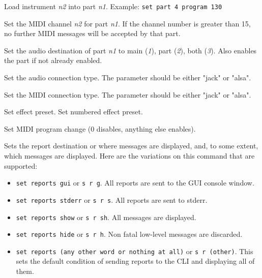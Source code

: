       Load instrument \textsl{n2} into part \textsl{n1}.
      Example: \texttt{set part 4 program 130}

      Set the MIDI channel \textsl{n2} for part \textsl{n1}.
      If the channel number is greater than 15, no further MIDI
      messages will be accepted by that part.

      Set the audio destination of part \textsl{n1}
      to main (\textsl{1}), part (\textsl{2}), both (\textsl{3}).
      Also enables the part if not already enabled.

      Set the audio connection type.
      The parameter should be either "jack" or "alsa".

      Set the MIDI connection type.
      The parameter should be either "jack" or "alsa".

      Set effect preset.
      Set numbered effect preset.

      Set MIDI program change (0 disables, anything else enables).

      Sets the report destination or where messages are displayed, and, to some
      extent, which messages are displayed.  Here are the variations on this
      command that are supported:

      \begin{itemize}
         \item \texttt{set reports gui} or \texttt{s r g}.
            All reports are sent to the GUI console window.
         \item \texttt{set reports stderr} or \texttt{s r s}.
            All reports are sent to stderr.
         \item \texttt{set reports show} or \texttt{s r sh}.
            All messages are displayed.
         \item \texttt{set reports hide} or \texttt{s r h}.
            Non fatal low-level messages are discarded.
         \item \texttt{set reports (any other word or nothing at all)} or
            \texttt{s r (other)}.
            This sets the default condition of sending reports to the CLI and
            displaying all of them.
      \end{itemize}

